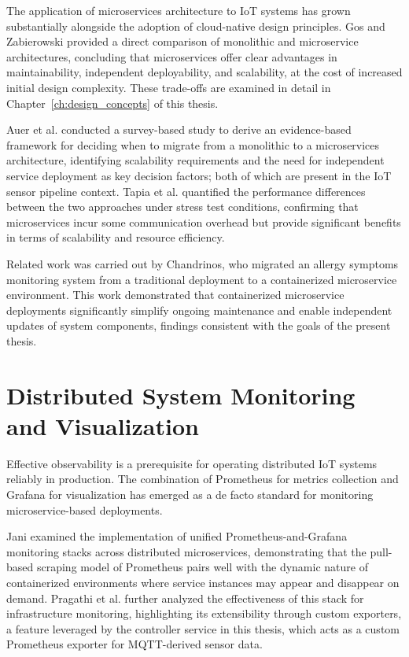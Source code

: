 The application of microservices architecture to IoT systems has grown substantially alongside the adoption of cloud-native design principles. Gos and Zabierowski\cite{monovsmicro} provided a direct comparison of monolithic and microservice architectures, concluding that microservices offer clear advantages in maintainability, independent deployability, and scalability, at the cost of increased initial design complexity. These trade-offs are examined in detail in Chapter~\ref{ch:design_concepts} of this thesis.

Auer et al.\cite{AUER2021106600} conducted a survey-based study to derive an evidence-based framework for deciding when to migrate from a monolithic to a microservices architecture, identifying scalability requirements and the need for independent service deployment as key decision factors; both of which are present in the IoT sensor pipeline context. Tapia et al.\cite{app10175797} quantified the performance differences between the two approaches under stress test conditions, confirming that microservices incur some communication overhead but provide significant benefits in terms of scalability and resource efficiency.

Related work was carried out by Chandrinos\cite{chandrinos_thesis}, who migrated an allergy symptoms monitoring system from a traditional deployment to a containerized microservice environment. This work demonstrated that containerized microservice deployments significantly simplify ongoing maintenance and enable independent updates of system components, findings consistent with the goals of the present thesis.

\section{Distributed System Monitoring and Visualization}

Effective observability is a prerequisite for operating distributed IoT systems reliably in production. The combination of Prometheus for metrics collection and Grafana for visualization has emerged as a de facto standard for monitoring microservice-based deployments.

Jani\cite{Jani2024-mg} examined the implementation of unified Prometheus-and-Grafana monitoring stacks across distributed microservices, demonstrating that the pull-based scraping model of Prometheus pairs well with the dynamic nature of containerized environments where service instances may appear and disappear on demand. Pragathi et al.\cite{Pragathi2024-fa} further analyzed the effectiveness of this stack for infrastructure monitoring, highlighting its extensibility through custom exporters, a feature leveraged by the controller service in this thesis, which acts as a custom Prometheus exporter for MQTT-derived sensor data.

